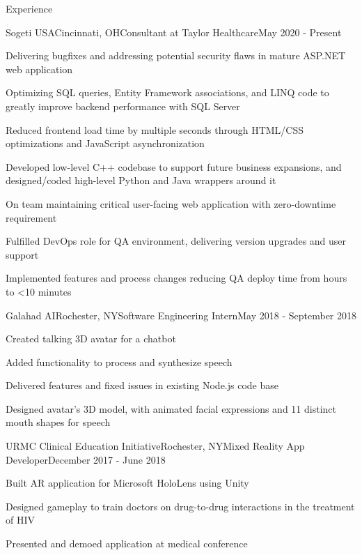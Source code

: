 \documentclass{resume} %
\begin{document}

\begin{rSection}{Experience}

\begin{rSubsection}{Sogeti USA}{Cincinnati, OH}{Consultant at Taylor Healthcare}{May 2020 - Present}
\item Delivering bugfixes and addressing potential security flaws in mature ASP.NET web application
\item Optimizing SQL queries, Entity Framework associations, and LINQ code to greatly improve backend performance with SQL Server
\item Reduced frontend load time by multiple seconds through HTML/CSS optimizations and JavaScript asynchronization
\item Developed low-level C++ codebase to support future business expansions, and designed/coded high-level Python and Java wrappers around it
\item On team maintaining critical user-facing web application with zero-downtime requirement
\item Fulfilled DevOps role for QA environment, delivering version upgrades and user support
\item Implemented features and process changes reducing QA deploy time from hours to <10 minutes
\end{rSubsection}


\begin{rSubsection}{Galahad AI}{Rochester, NY}{Software Engineering Intern}{May 2018 - September 2018}
\item Created talking 3D avatar for a chatbot
\item Added functionality to process and synthesize speech
\item Delivered features and fixed issues in existing Node.js code base
\item Designed avatar’s 3D model, with animated facial expressions and 11 distinct mouth shapes for speech
\end{rSubsection}


\begin{rSubsection}{URMC Clinical Education Initiative}{Rochester, NY}{Mixed Reality App Developer}{December 2017 - June 2018}
\item Built AR application for Microsoft HoloLens using Unity
\item Designed gameplay to train doctors on drug-to-drug interactions in the treatment of HIV
\item Presented and demoed application at medical conference
\end{rSubsection}


\end{rSection}
\end{document}
